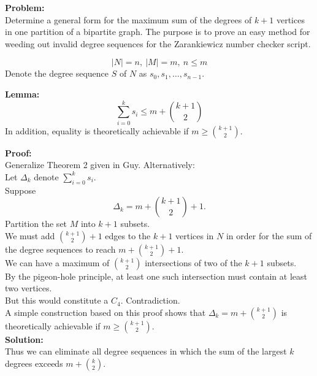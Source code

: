 \documentclass[12 pt]{article}
\begin{document}
\textbf{Problem:}\\
Determine a general form for the maximum sum of the degrees of $k+1$ vertices in 
one partition of a bipartite graph. The purpose is to prove an easy method for 
weeding out invalid degree sequences for the Zarankiewicz number checker script.

\begin{center}\end{center}

$$|N|=n,\ |M|=m,\ n\le m $$
Denote the degree sequence $S$ of $N$ as $s_0, s_1, \ldots, s_{n-1}$.

\vspace{.5cm}

\textbf{Lemma:}
$$\sum_{i=0}^ks_i \le m + \binom{k+1}{2}$$
In addition, equality is theoretically achievable if $m \ge \binom{k+1}{2}$.

\vspace{.5cm}

\textbf{Proof:}\\
Generalize Theorem 2 given in Guy. Alternatively:\\

Let $\Delta_k$ denote $\sum_{i=0}^ks_i$.\\
Suppose $$\Delta_k = m + \binom{k+1}{2} + 1.$$
Partition the set $M$ into $k+1$ subsets.\\
We must add $\binom{k+1}{2} + 1$ edges to the $k+1$ vertices in $N$ in order for
the sum of the degree sequences to reach $m + \binom{k+1}{2} + 1$.\\
We can have a maximum of $\binom{k+1}{2}$ intersections of two of the $k+1$ subsets.\\
By the pigeon-hole principle, at least one such intersection must contain at least two
vertices.\\
But this would constitute a $C_4$. Contradiction.\\

A simple construction based on this proof shows that $\Delta_k=m+\binom{k+1}{2}$ is
theoretically achievable if $m\ge \binom{k+1}{2}$.\\

\textbf{Solution:}\\
Thus we can eliminate all degree sequences in which the sum of the largest $k$ degrees
exceeds $m + \binom{k}2$.
\end{document}

